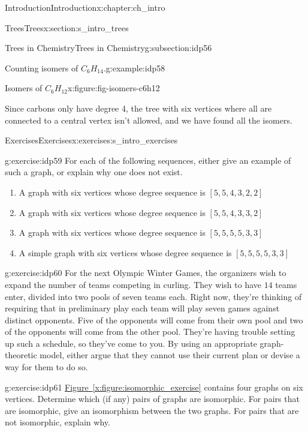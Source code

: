 \documentclass[oneside,10pt,]{book}
\newcommand{\xreffont}{\relax}
\numberwithin{equation}{section}
\begin{document}
\begin{chapterptx}{Introduction}{}{Introduction}{}{}{x:chapter:ch_intro}
\begin{sectionptx}{Trees}{}{Trees}{}{}{x:section:s_intro_trees}
\begin{subsectionptx}{Trees in Chemistry}{}{Trees in Chemistry}{}{}{g:subsection:idp56}
\begin{example}{Counting isomers of \(C_6H_{14}\).}{g:example:idp58}
\begin{figureptx}{Isomers of \(C_6H_{12}\)}{x:figure:fig-isomers-c6h12}{}
\begin{image}{0.05}{0.9}{0.05}
{\begin{tikzpicture}[scale=.5]
\end{tikzpicture}
}%
\end{image}%
\tcblower
\end{figureptx}%
Since carbons only have degree 4, the tree with six vertices where all are connected to a central vertex isn't allowed, and we have found all the isomers.%
\end{example}
\end{subsectionptx}
\end{sectionptx}
%
%
\typeout{************************************************}
\typeout{************************************************}
%
\begin{exercises-section}{Exercises}{}{Exercises}{}{}{x:exercises:s_intro_exercises}
\begin{divisionexercise}{1}{}{}{g:exercise:idp59}%
For each of the following sequences, either give an example of such a graph, or explain why one does not exist.%
%
\begin{enumerate}[label=(\alph*)]
\item{}A graph with six vertices whose degree sequence is \([5,5,4,3,2,2]\)%
\item{}A graph with six vertices whose degree sequence is \([5,5,4,3,3,2]\)%
\item{}A graph with six vertices whose degree sequence is \([5,5,5,5,3,3]\)%
\item{}A simple graph with six vertices whose degree sequence is \([5,5,5,5,3,3]\)%
\end{enumerate}
\end{divisionexercise}%
\begin{divisionexercise}{2}{}{}{g:exercise:idp60}%
For the next Olympic Winter Games, the organizers wish to expand the number of teams competing in curling. They wish to have \(14\) teams enter, divided into two pools of seven teams each. Right now, they're thinking of requiring that in preliminary play each team will play seven games against distinct opponents. Five of the opponents will come from their own pool and two of the opponents will come from the other pool. They're having trouble setting up such a schedule, so they've come to you. By using an appropriate graph-theoretic model, either argue that they cannot use their current plan or devise a way for them to do so.%
\end{divisionexercise}%
\begin{divisionexercise}{3}{}{}{g:exercise:idp61}%
\hyperref[x:figure:isomorphic_exercise]{Figure~{\xreffont\ref{x:figure:isomorphic_exercise}}} contains four graphs on six vertices. Determine which (if any) pairs of graphs are isomorphic. For pairs that are isomorphic, give an isomorphism between the two graphs. For pairs that are not isomorphic, explain why.%

\end{divisionexercise}
\end{exercises-section}
\end{chapterptx}
\end{document}
